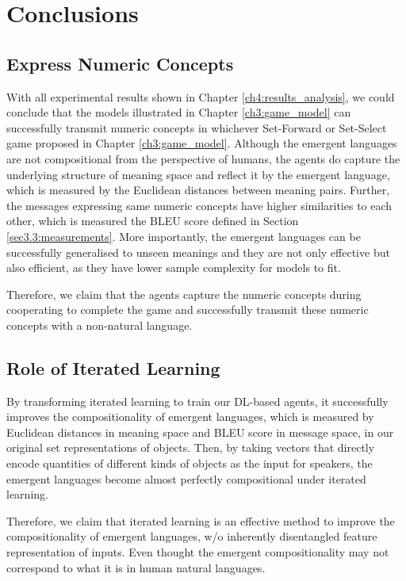 \chapter{Conclusions}
\label{ch5:conclusion}

\section{Express Numeric Concepts}
\label{sec5.1:numeric_represent}

With all experimental results shown in Chapter \ref{ch4:results_analysis}, we could conclude that the models illustrated in Chapter \ref{ch3:game_model} can successfully transmit numeric concepts in whichever Set-Forward or Set-Select game proposed in Chapter \ref{ch3:game_model}. Although the emergent languages are not compositional from the perspective of humans, the agents do capture the underlying structure of meaning space and reflect it by the emergent language, which is measured by the Euclidean distances between meaning pairs. Further, the messages expressing same numeric concepts have higher similarities to each other, which is measured the BLEU score defined in Section \ref{sec3.3:measurements}. More importantly, the emergent languages can be successfully generalised to unseen meanings and they are not only effective but also efficient, as they have lower sample complexity for models to fit.

Therefore, we claim that the agents capture the numeric concepts during cooperating to complete the game and successfully transmit these numeric concepts with a non-natural language.

\section{Role of Iterated Learning}
\label{sec5.2:iterated_learning}

By transforming iterated learning to train our DL-based agents, it successfully improves the compositionality of emergent languages, which is measured by Euclidean distances in meaning space and BLEU score in message space, in our original set representations of objects. Then, by taking vectors that directly encode quantities of different kinds of objects as the input for speakers, the emergent languages become almost perfectly compositional under iterated learning.

Therefore, we claim that iterated learning is an effective method to improve the compositionality of emergent languages, w/o inherently disentangled feature representation of inputs. Even thought the emergent compositionality may not correspond to what it is in human natural languages.

